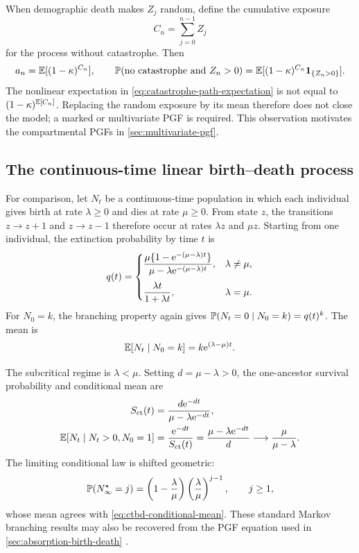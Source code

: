When demographic death makes $Z_j$ random, define the cumulative exposure
\[
  C_n=\sum_{j=0}^{n-1}Z_j
\]
for the process without catastrophe.  Then
\begin{equation}
  a_n=\mathbb{E}[(1-\kappa)^{C_n}],
  \qquad
  \mathbb{P}(\text{no catastrophe and }Z_n>0)
  =\mathbb{E}[(1-\kappa)^{C_n}\mathbf{1}_{\{Z_n>0\}}].
  \label{eq:catastrophe-path-expectation}
\end{equation}
The nonlinear expectation in \cref{eq:catastrophe-path-expectation} is not equal to $(1-\kappa)^{\mathbb{E}[C_n]}$.  Replacing the random exposure by its mean therefore does not close the model; a marked or multivariate PGF is required.  This observation motivates the compartmental PGFs in \cref{sec:multivariate-pgf}.

\subsection{The continuous-time linear birth--death process}
\label{sec:continuous-birth-death}

For comparison, let $N_t$ be a continuous-time population in which each individual gives birth at rate $\lambda\ge0$ and dies at rate $\mu\ge0$.  From state $z$, the transitions $z\to z+1$ and $z\to z-1$ therefore occur at rates $\lambda z$ and $\mu z$.  Starting from one individual, the extinction probability by time $t$ is
\begin{equation}
  q(t)=
  \begin{cases}
    \displaystyle
    \frac{\mu\{1-\mathrm{e}^{-(\mu-\lambda)t}\}}
         {\mu-\lambda\mathrm{e}^{-(\mu-\lambda)t}},
      & \lambda\ne\mu,\\[4mm]
    \displaystyle
    \frac{\lambda t}{1+\lambda t},
      & \lambda=\mu.
  \end{cases}
  \label{eq:ctbd-extinction}
\end{equation}
For $N_0=k$, the branching property again gives $\mathbb{P}(N_t=0\mid N_0=k)=q(t)^k$.  The mean is
\begin{equation}
  \mathbb{E}[N_t\mid N_0=k]=k\mathrm{e}^{(\lambda-\mu)t}.
  \label{eq:ctbd-mean}
\end{equation}

The subcritical regime is $\lambda<\mu$.  Setting $d=\mu-\lambda>0$, the one-ancestor survival probability and conditional mean are
\begin{align}
  S_{\mathrm{ct}}(t)
    &=\frac{d\mathrm{e}^{-dt}}{\mu-\lambda\mathrm{e}^{-dt}},
    \label{eq:ctbd-survival}\\
  \mathbb{E}[N_t\mid N_t>0,N_0=1]
    &=\frac{\mathrm{e}^{-dt}}{S_{\mathrm{ct}}(t)}
     =\frac{\mu-\lambda\mathrm{e}^{-dt}}{d}
     \longrightarrow \frac{\mu}{\mu-\lambda}.
    \label{eq:ctbd-conditional-mean}
\end{align}
The limiting conditional law is shifted geometric:
\begin{equation}
  \mathbb{P}(N_\infty^\star=j)
  =\left(1-\frac{\lambda}{\mu}\right)
     \left(\frac{\lambda}{\mu}\right)^{j-1},
  \qquad j\ge1,
  \label{eq:ctbd-yaglom}
\end{equation}
whose mean agrees with \cref{eq:ctbd-conditional-mean}.  These standard Markov branching results may also be recovered from the PGF equation used in \cref{sec:absorption-birth-death} \cite{Athreya1972}.

